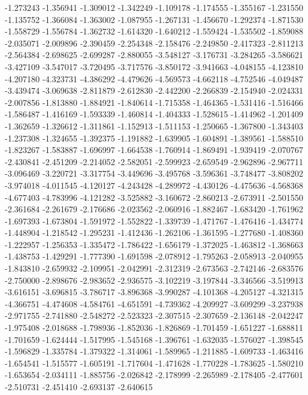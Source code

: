 -1.273243
-1.356941
-1.309012
-1.342249
-1.109178
-1.174555
-1.355167
-1.231550
-1.135752
-1.366084
-1.363002
-1.087955
-1.267131
-1.456670
-1.292374
-1.871530
-1.558729
-1.556784
-1.362732
-1.614320
-1.640212
-1.559424
-1.535502
-1.859088
-2.035071
-2.009896
-2.390459
-2.254348
-2.158476
-2.249850
-2.417323
-2.811213
-2.564384
-2.698625
-2.699287
-2.880055
-3.548127
-3.176731
-3.284265
-3.586621
-3.427109
-3.547017
-3.720495
-3.717576
-3.850172
-3.941663
-4.048155
-4.123810
-4.207180
-4.323731
-4.386292
-4.479626
-4.569573
-4.662118
-4.752546
-4.049487
-3.439474
-3.069638
-2.811879
-2.612830
-2.442200
-2.266839
-2.154940
-2.024331
-2.007856
-1.813880
-1.884921
-1.840614
-1.715358
-1.464365
-1.531416
-1.516466
-1.586487
-1.416169
-1.593339
-1.460814
-1.404333
-1.528615
-1.414962
-1.201409
-1.362659
-1.326612
-1.311861
-1.152913
-1.511153
-1.250665
-1.367800
-1.343403
-1.237308
-1.324655
-1.392375
-1.191882
-1.639905
-1.604891
-1.389561
-1.588510
-1.823267
-1.583887
-1.696997
-1.664538
-1.760914
-1.869491
-1.939419
-2.070767
-2.430841
-2.451209
-2.214052
-2.582051
-2.599923
-2.659549
-2.962896
-2.967711
-3.096469
-3.220721
-3.317754
-3.449696
-3.495768
-3.596361
-3.748477
-3.808202
-3.974018
-4.011545
-4.120127
-4.243428
-4.289972
-4.430126
-4.475636
-4.568368
-4.677403
-4.783996
-4.121282
-3.525882
-3.160672
-2.860213
-2.673911
-2.501550
-2.361684
-2.261679
-2.176686
-2.023562
-2.060916
-1.882467
-1.683420
-1.761962
-1.697393
-1.673804
-1.591972
-1.552822
-1.339739
-1.471767
-1.476416
-1.434774
-1.448904
-1.218542
-1.295231
-1.412436
-1.262106
-1.361595
-1.277680
-1.408360
-1.222957
-1.256353
-1.335472
-1.786422
-1.656179
-1.372025
-1.463812
-1.368663
-1.438753
-1.429291
-1.777390
-1.691598
-2.078912
-1.795263
-2.058913
-2.040955
-1.843810
-2.659932
-2.109951
-2.042991
-2.312319
-2.673563
-2.742146
-2.683576
-2.750000
-2.898676
-2.983652
-2.936575
-3.102219
-3.197844
-3.346566
-3.519913
-3.616151
-3.696815
-3.786717
-3.896368
-3.990287
-4.101368
-4.205127
-4.321315
-4.366751
-4.474608
-4.584761
-4.651591
-4.739362
-4.209927
-3.609299
-3.237938
-2.971755
-2.741880
-2.548272
-2.523323
-2.307515
-2.307659
-2.136148
-2.042247
-1.975408
-2.018688
-1.798936
-1.852036
-1.826869
-1.701459
-1.651227
-1.688811
-1.701659
-1.624444
-1.517995
-1.545168
-1.396761
-1.632035
-1.576027
-1.398545
-1.596829
-1.335784
-1.379322
-1.314061
-1.589965
-1.211885
-1.609733
-1.463416
-1.654541
-1.515577
-1.605191
-1.717604
-1.471628
-1.770228
-1.783625
-1.580210
-1.653654
-2.034111
-1.885756
-2.026842
-2.178999
-2.265989
-2.178405
-2.477601
-2.510731
-2.451410
-2.693137
-2.640615
